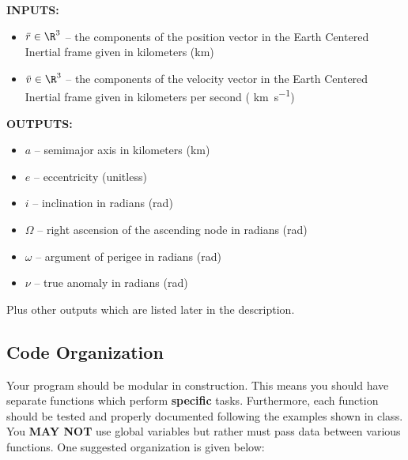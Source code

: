 \documentclass[11pt, reqno]{article}    %
\begin{document}
\noindent \textbf{INPUTS:}
\begin{itemize}
    \item \( \bar r \in \R^{3} \) -- the components of the position vector in the Earth Centered Inertial frame given in kilometers (\si{\kilo\meter})
    \item \( \bar v \in \R^{3} \) -- the components of the velocity vector in the Earth Centered Inertial frame given in kilometers per second ( \si{\kilo\meter\per\second})
\end{itemize}

\noindent \textbf{OUTPUTS:}
\begin{itemize}
    \item \( a \)  -- semimajor axis in kilometers (\si{\kilo\meter})
    \item \( e \) -- eccentricity (unitless)
    \item \( i \) -- inclination in radians (\si{\radian})
    \item \( \Omega \) -- right ascension of the ascending node in radians (\si{\radian})
    \item \( \omega \) -- argument of perigee in radians (\si{\radian})
    \item \( \nu \) -- true anomaly in radians (\si{\radian})
\end{itemize}
Plus other outputs which are listed later in the description.

\subsection*{Code Organization} 
Your program should be modular in construction. 
This means you should have separate functions which perform \textbf{specific} tasks.
Furthermore, each function should be tested and properly documented following the examples shown in class.
You \textbf{MAY NOT}  use global variables but rather must pass data between various functions.
One suggested organization is given below:
\end{document}
